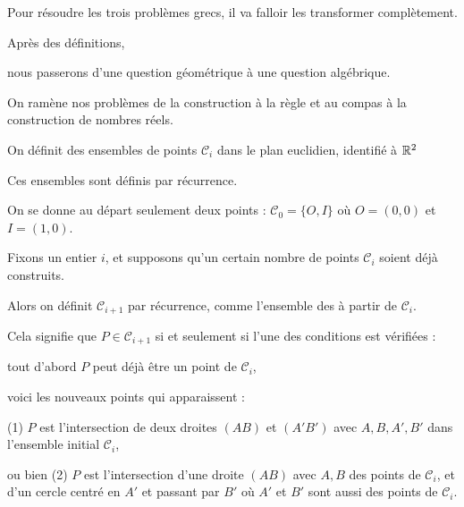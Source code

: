 



\newcommand{\construc}{\mathcal{C}}
\newcommand{\plan}{\mathcal{P}}
\newcommand{\cercle}{\mathcal{C}}



\debuttexte


\diapo

\change
Pour résoudre les trois problèmes grecs, il va falloir les transformer complètement.

\change
Après des définitions,

\change
nous passerons d'une question géométrique à une question algébrique.

\change
On ramène nos problèmes de la construction à la règle et au compas à la construction
de nombres réels.


\diapo


On définit des ensembles de points $\construc_i$ dans le plan euclidien, identifié à $\mathbb{R}^2$

Ces ensembles sont définis par récurrence.

\change

On se donne au départ seulement deux points : $\construc_0 = \{ O, I\}$ où $O=(0,0)$ et $I=(1,0)$. 

\change
Fixons un entier $i$, et supposons qu'un certain nombre de points $\construc_i$
  soient déjà construits.
  
\change
Alors on définit $\construc_{i+1}$ par récurrence,
comme l'ensemble des 
à partir de $\construc_i$. 

\change
Cela signifie que  $P \in \construc_{i+1}$ si et seulement si l'une des conditions est vérifiées :


\change
  tout d'abord $P$ peut déjà être un point de $\construc_i$,
  
voici les nouveaux points qui apparaissent : 

\change
(1) $P$ est l'intersection de deux droites $(AB)$ et $(A'B')$ avec $A, B, A', B'$ dans l'ensemble 
    initial $\construc_i$,
    
\change    
ou bien (2) $P$ est l'intersection d'une droite  $(AB)$ avec $A,B$ des points de $\construc_i$,
et d'un cercle centré en $A'$ et passant par $B'$ où $A'$ et $B'$ sont aussi des points de $\construc_i$.

